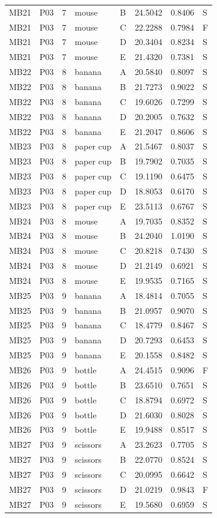 \documentclass[11pt]{article}
\begin{document}
\begin{longtable}{lll llrrl}
MB21 & P03 & 7 & mouse & B & 24.5042 & 0.8406 & S \\
MB21 & P03 & 7 & mouse & C & 22.2288 & 0.7984 & F \\
MB21 & P03 & 7 & mouse & D & 20.3404 & 0.8234 & S \\
MB21 & P03 & 7 & mouse & E & 21.4320 & 0.7381 & S \\
MB22 & P03 & 8 & banana & A & 20.5840 & 0.8097 & S \\
MB22 & P03 & 8 & banana & B & 21.7273 & 0.9022 & S \\
MB22 & P03 & 8 & banana & C & 19.6026 & 0.7299 & S \\
MB22 & P03 & 8 & banana & D & 20.2005 & 0.7632 & S \\
MB22 & P03 & 8 & banana & E & 21.2047 & 0.8606 & S \\
MB23 & P03 & 8 & paper cup & A & 21.5467 & 0.8037 & S \\
MB23 & P03 & 8 & paper cup & B & 19.7902 & 0.7035 & S \\
MB23 & P03 & 8 & paper cup & C & 19.1190 & 0.6475 & S \\
MB23 & P03 & 8 & paper cup & D & 18.8053 & 0.6170 & S \\
MB23 & P03 & 8 & paper cup & E & 23.5113 & 0.6767 & S \\
MB24 & P03 & 8 & mouse & A & 19.7035 & 0.8352 & S \\
MB24 & P03 & 8 & mouse & B & 24.2040 & 1.0190 & S \\
MB24 & P03 & 8 & mouse & C & 20.8218 & 0.7430 & S \\
MB24 & P03 & 8 & mouse & D & 21.2149 & 0.6921 & S \\
MB24 & P03 & 8 & mouse & E & 19.9535 & 0.7165 & S \\
MB25 & P03 & 9 & banana & A & 18.4814 & 0.7055 & S \\
MB25 & P03 & 9 & banana & B & 21.0957 & 0.9070 & S \\
MB25 & P03 & 9 & banana & C & 18.4779 & 0.8467 & S \\
MB25 & P03 & 9 & banana & D & 20.7293 & 0.6453 & S \\
MB25 & P03 & 9 & banana & E & 20.1558 & 0.8482 & S \\
MB26 & P03 & 9 & bottle & A & 24.4515 & 0.9096 & F \\
MB26 & P03 & 9 & bottle & B & 23.6510 & 0.7651 & S \\
MB26 & P03 & 9 & bottle & C & 18.8794 & 0.6972 & S \\
MB26 & P03 & 9 & bottle & D & 21.6030 & 0.8028 & S \\
MB26 & P03 & 9 & bottle & E & 19.9488 & 0.8517 & S \\
MB27 & P03 & 9 & scissors & A & 23.2623 & 0.7705 & S \\
MB27 & P03 & 9 & scissors & B & 22.0770 & 0.8524 & S \\
MB27 & P03 & 9 & scissors & C & 20.0995 & 0.6642 & S \\
MB27 & P03 & 9 & scissors & D & 21.0219 & 0.9843 & F \\
MB27 & P03 & 9 & scissors & E & 19.5680 & 0.6959 & S \\
\bottomrule
\end{longtable}
\normalsize
\end{document}
